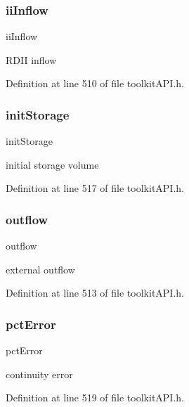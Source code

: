 \subsubsection{\texorpdfstring{iiInflow}{iiInflow}}
{\footnotesize\ttfamily ii\+Inflow}

R\+D\+II inflow 

Definition at line 510 of file toolkit\+A\+P\+I.\+h.

\mbox{\label{struct_s_m___routing_totals_add0f27c9cc788302f259ee9a4c9b2f48}} 
\subsubsection{\texorpdfstring{initStorage}{initStorage}}
{\footnotesize\ttfamily init\+Storage}

initial storage volume 

Definition at line 517 of file toolkit\+A\+P\+I.\+h.

\mbox{\label{struct_s_m___routing_totals_acdc4839742c90f3ca60e8243b8631b1b}} 
\subsubsection{\texorpdfstring{outflow}{outflow}}
{\footnotesize\ttfamily outflow}

external outflow 

Definition at line 513 of file toolkit\+A\+P\+I.\+h.

\mbox{\label{struct_s_m___routing_totals_a061bfec118db4216f0062258ce029ec2}} 
\subsubsection{\texorpdfstring{pctError}{pctError}}
{\footnotesize\ttfamily pct\+Error}

continuity error 

Definition at line 519 of file toolkit\+A\+P\+I.\+h.

